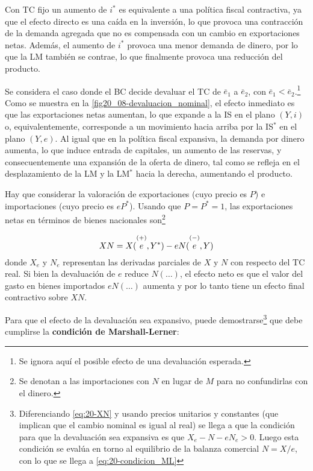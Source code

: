 \documentclass[DeGregorioResumen]{subfiles}
\begin{document}

Con TC fijo un aumento de $i^*$ es equivalente a una política fiscal contractiva, ya que el efecto directo es una caída en la inversión, lo que provoca una contracción de la demanda agregada que no es compensada con un cambio en exportaciones netas. Además, el aumento de $i^*$ provoca una menor demanda de dinero, por lo que la LM también se contrae, lo que finalmente provoca una reducción del producto.


Se considera el caso donde el BC decide devaluar el TC de $\overline e_1$ a $\overline e_2$, con $\overline e_1<\overline e_2$.\footnote{Se ignora aquí el posible efecto de una devaluación esperada.} Como se muestra en la \autoref{fig20_08-devaluacion_nominal}, el efecto inmediato es que las exportaciones netas aumentan, lo que expande a la IS en el plano $(Y, i)$ o, equivalentemente, corresponde a un movimiento hacia arriba por la IS$^*$ en el plano $(Y, e)$. Al igual que en la política fiscal expansiva, la demanda por dinero aumenta, lo que induce entrada de capitales, un aumento de las reservas, y consecuentemente una expansión de la oferta de dinero, tal como se refleja en el desplazamiento de la LM y la LM$^*$ hacia la derecha, aumentando el producto.



Hay que considerar la valoración de exportaciones (cuyo precio es $P$) e importaciones (cuyo precio es $eP^*$). Usando que $P=P^*=1$, las exportaciones netas en términos de bienes nacionales son\footnote{Se denotan a las importaciones con $N$ en lugar de $M$ para no confundirlas con el dinero.}

\begin{equation}
	XN = X(\overset{(+)}{\mathstrut e}, Y^*) - eN(\overset{(-)}{\mathstrut e}, Y)
	\label{eq:20-XN}
\end{equation}
donde $X_e$ y $N_e$ representan las derivadas parciales de $X$ y $N$ con respecto del TC real. Si bien la devaluación de $e$ reduce $N(\ldots)$, el efecto neto es que el valor del gasto en bienes importados $eN(\ldots)$ aumenta y por lo tanto tiene un efecto final contractivo sobre $XN$.

Para que el efecto de la devaluación sea expansivo, puede demostrarse\footnote{Diferenciando \eqref{eq:20-XN} y usando precios unitarios y constantes (que implican que el cambio nominal es igual al real) se llega a que la condición para que la devaluación sea expansiva es que $X_e-N-eN_e>0$. Luego esta condición se evalúa en torno al equilibrio de la balanza comercial $N=X/e$, con lo que se llega a \eqref{eq:20-condicion_ML}} que debe cumplirse la \textbf{condición de Marshall-Lerner}:
\end{document}
